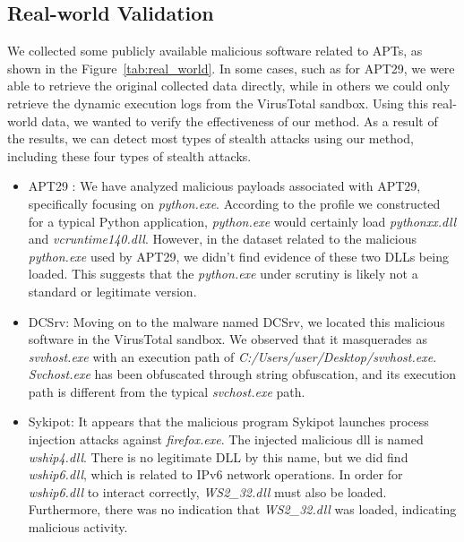 

\subsection{Real-world Validation}
\label{sec-real-world}

We collected some publicly available malicious software related to APTs, as shown in the Figure~\ref{tab:real_world}.
In some cases, such as for APT29, we were able to retrieve the original collected data directly, while in others we could only retrieve the dynamic execution logs from the VirusTotal sandbox. Using this real-world data, we wanted to verify the effectiveness of our method. As a result of the results, we can detect most types of stealth attacks using our method, including these four types of stealth attacks.

\begin{itemize}
    \item APT29 \cite{mitre_g0016}: We have analyzed malicious payloads associated with APT29, specifically focusing on \textit{python.exe}. According to the profile we constructed for a typical Python application, \textit{python.exe} would certainly load \textit{pythonxx.dll} and \textit{vcruntime140.dll}. However, in the dataset related to the malicious \textit{python.exe} used by APT29, we didn't find evidence of these two DLLs being loaded. This suggests that the \textit{python.exe} under scrutiny is likely not a standard or legitimate version.

    \item DCSrv\cite{checkpoint2021}: Moving on to the malware named DCSrv, we located this malicious software in the VirusTotal sandbox. We observed that it masquerades as \textit{svvhost.exe} with an execution path of \textit{C:/Users/user/Desktop/svvhost.exe}. \textit{Svchost.exe} has been obfuscated through string obfuscation, and its execution path is different from the typical \textit{svchost.exe} path.

    \item Sykipot\cite{att2023}: It appears that the malicious program Sykipot launches process injection attacks against \textit{firefox.exe}. The injected malicious dll is named \textit{wship4.dll}. There is no legitimate DLL by this name, but we did find \textit{wship6.dll}, which is related to IPv6 network operations. In order for \textit{wship6.dll} to interact correctly, \textit{WS2\_32.dll} must also be loaded. Furthermore, there was no indication that \textit{WS2\_32.dll} was loaded, indicating malicious activity.
\end{itemize}








